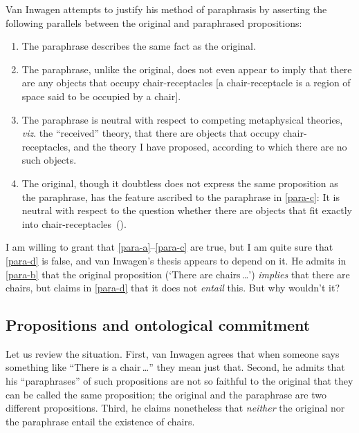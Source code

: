 \documentclass[12pt,twoside]{reedfancy}
\begin{document}
\begin{spacing}{1.25}
Van Inwagen attempts to justify his method of paraphrasis by asserting
the following parallels between the original and paraphrased
propositions:
\begin{enumerate}[ref=(\arabic*)]
	\item The paraphrase describes the same fact as the
          original.  \label{para-a}
	\item The paraphrase, unlike the original, does not even
          appear to imply that there are any objects that occupy
          chair-receptacles [a chair-receptacle is a region of space
            said to be occupied by a chair].  \label{para-b}
	\item The paraphrase is neutral with respect to competing
          metaphysical theories, {\em viz}.  the ``received'' theory,
          that there are objects that occupy chair-receptacles, and
          the theory I have proposed, according to which there are no
          such objects.  \label{para-c}
	\item The original, though it doubtless does not express the
          same proposition as the paraphrase, has the feature ascribed
          to the paraphrase in \ref{para-c}: It is neutral with
          respect to the question whether there are objects that fit
          exactly into
          chair-receptacles~(\citeyear[113]{inwagen1995}).  \label{para-d}
\end{enumerate}
I am willing to grant that \ref{para-a}--\ref{para-c} are true, but I
am quite sure that \ref{para-d} is false, and van Inwagen's thesis
appears to depend on it.  He admits in \ref{para-b} that the original
proposition (`There are chairs\,\ldots ') {\em implies} that there
are chairs, but claims in \ref{para-d} that it does not {\em entail}
this.  But why wouldn't it?

\subsection{Propositions and ontological commitment}
\label{prop-ont}
Let us review the situation.  First, van Inwagen agrees that when
someone says something like ``There is a chair\,\ldots '' they mean
just that.  Second, he admits that his ``paraphrases'' of such
propositions are not so faithful to the original that they can be
called the same proposition; the original and the paraphrase are two
different propositions.  Third, he claims nonetheless that {\em
  neither} the original nor the paraphrase entail the existence of
chairs.


\end{spacing}
\end{document}
